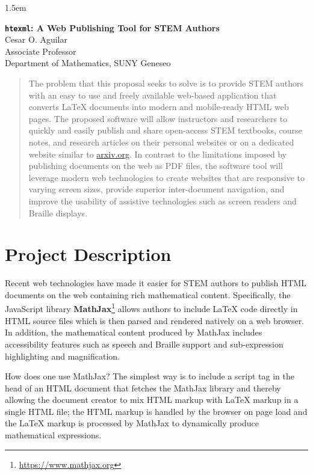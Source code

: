 \documentclass[12pt]{article}
\begin{document}
\baselineskip 1.5em
\begin{center}
{\bfseries {\large \texttt{htexml}}: A Web Publishing Tool for STEM Authors}\\
Cesar O. Aguilar \\ Associate Professor \\ Department of Mathematics, SUNY Geneseo
\end{center}

\begin{abstract}
The problem that this proposal seeks to solve is to provide STEM authors with an easy to use and freely available web-based application that converts LaTeX documents into modern and mobile-ready HTML web pages.  The proposed software will allow instructors and researchers to quickly and easily publish and share open-access STEM textbooks, course notes, and research articles on their personal websites or on a dedicated website similar to \href{arxiv.org}{arxiv.org}.  In contrast to the limitations imposed by publishing documents on the web as PDF files, the software tool will leverage modern web technologies to create websites that are responsive to varying screen sizes, provide superior inter-document navigation, and improve the usability of assistive technologies such as screen readers and Braille displays.
\end{abstract}

\section{Project Description}
Recent web technologies have made it easier for STEM authors to publish HTML documents on the web containing rich mathematical content.  Specifically, the JavaScript library \textbf{MathJax}\footnote{\href{https://www.mathjax.org}{https://www.mathjax.org}} allows authors to include LaTeX code directly in HTML source files which is then parsed and rendered natively on a web browser. In addition, the mathematical content produced by MathJax includes accessibility features such as speech and Braille support and sub-expression highlighting and magnification. 

How does one use MathJax?  The simplest way is to include a script tag in the head of an HTML document that fetches the MathJax library and thereby allowing the document creator to mix HTML markup with LaTeX markup in a single HTML file; the HTML markup is handled by the browser on page load and the LaTeX markup is processed by MathJax to dynamically produce mathematical expressions.
\end{document}
